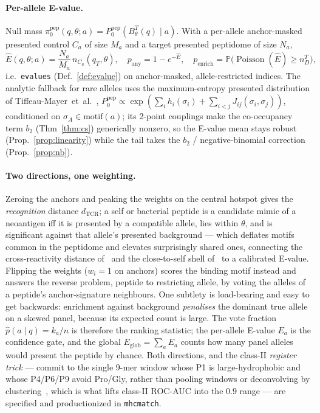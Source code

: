 \documentclass[11pt]{article}
\theoremstyle{oldplain}
\theoremstyle{oldrem}
\DeclareMathOperator{\Poisson}{Poisson}
\newcommand{\Pzero}{P_{0}}
\newcommand{\Prob}{\mathbb{P}}
\begin{document}
\paragraph{Per-allele E-value.}
Null mass $\pi^{\mathrm{pep}}_0(q,\theta;a)=\Pzero^{\mathrm{pep}}(B^T_\theta(q)\mid a)$. With a
per-allele anchor-masked presented control $C_a$ of size $M_a$ and a target presented peptidome of
size $N_a$,
\begin{equation}\label{eq:epitope-evalue}
  \widehat E(q,\theta;a)=\frac{N_a}{M_a}\,n_{C_a}(q_T,\theta),\quad
  p_{\mathrm{any}}=1-e^{-\widehat E},\quad
  p_{\mathrm{enrich}}=\Prob\!\big(\Poisson(\widehat E)\ge n^{T}_D\big),
\end{equation}
i.e.\ \texttt{evalues} (Def.~\ref{def:evalue}) on anchor-masked, allele-restricted indices. The
analytic fallback for rare alleles uses the maximum-entropy presented distribution of
Tiffeau-Mayer~et~al.~\cite{TiffeauMayer2026},
$\Pzero^{\mathrm{pep}}\propto\exp(\sum_i h_i(\sigma_i)+\sum_{i<j}J_{ij}(\sigma_i,\sigma_j))$,
conditioned on $\sigma_A\in\mathrm{motif}(a)$; its 2-point couplings make the co-occupancy term $b_2$
(Thm~\ref{thm:cs}) generically nonzero, so the E-value mean stays robust (Prop.~\ref{prop:linearity})
while the tail takes the $b_2$ / negative-binomial correction (Prop.~\ref{prop:nb}).

\paragraph{Two directions, one weighting.} Zeroing the anchors and peaking the weights on the central
hotspot gives the \emph{recognition} distance $d_{\mathrm{TCR}}$; a self or bacterial peptide is a
candidate mimic of a neoantigen iff it is presented by a compatible allele, lies within $\theta$, and
is significant against that allele's presented background --- which deflates motifs common in the
peptidome and elevates surprisingly shared ones, connecting the cross-reactivity distance
of~\cite{Luksza2017} and the close-to-self shell of~\cite{TiffeauMayer2026} to a calibrated E-value.
Flipping the weights ($w_i=1$ on anchors) scores the binding motif instead and answers the reverse
problem, peptide to restricting allele, by voting the alleles of a peptide's anchor-signature
neighbours. One subtlety is load-bearing and easy to get backwards: enrichment against background
\emph{penalises} the dominant true allele on a skewed panel, because its expected count is large. The
vote fraction $\hat p(a\mid q)=k_a/n$ is therefore the ranking statistic; the per-allele E-value $E_a$
is the confidence gate, and the global $E_{\mathrm{glob}}=\sum_a E_a$ counts how many panel alleles
would present the peptide by chance. Both directions, and the class-II \emph{register trick} --- commit
to the single 9-mer window whose P1 is large-hydrophobic and whose P4/P6/P9 avoid Pro/Gly, rather than
pooling windows or deconvolving by clustering~\cite{Andreatta2017,Alvarez2019}, which is what lifts
class-II ROC-AUC into the $0.9$ range --- are specified and productionized in \texttt{mhcmatch}.
\end{document}
